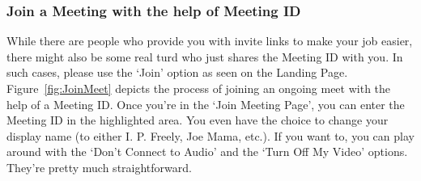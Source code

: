 \documentclass[14pt]{report}
\begin{document}
                        \subsubsection{Join a Meeting with the help of Meeting ID}
                            While there are people who provide you with invite links to make your job easier, there might also be some real turd who just shares the Meeting ID with you. In such cases, please use the `Join' option as seen on the Landing Page.\\

                            Figure~\ref{fig:JoinMeet} depicts the process of joining an ongoing meet with the help of a Meeting ID. Once you're in the `Join Meeting Page', you can enter the Meeting ID in the highlighted area. You even have the choice to change your display name (to either I. P. Freely, Joe Mama, etc.). If you want to, you can play around with the `Don't Connect to Audio' and the `Turn Off My Video' options. They're pretty much straightforward.\\
\end{document}
